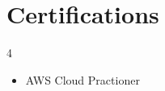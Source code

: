 \documentclass[letterpaper,11pt]{article}
\newcommand{\resumeSubHeadingListStart}{\begin{itemize}[leftmargin=0.0in, label={}]}
\begin{document}
\vspace{-5pt}
  \section{Certifications}
        \begin{multicols}{4}
            \begin{itemize}[itemsep=-5pt, parsep=5pt]
              \item AWS Cloud Practioner
            \end{itemize}
        \end{multicols}
\vspace*{2.0\multicolsep}


\vspace{-5pt}
\end{document}
